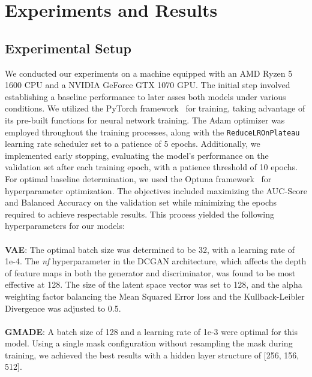 \cleardoubleoddpage%
\chapter{Experiments and Results}
\section{Experimental Setup}
We conducted our experiments on a machine equipped with an AMD Ryzen 5 1600 CPU and a NVIDIA GeForce GTX 1070 GPU. The initial step involved establishing a baseline performance to later asses both models under various conditions. We utilized the PyTorch framework~\cite{paszke2019pytorch} for training, taking advantage of its pre-built functions for neural network training. The Adam optimizer was employed throughout the training processes, along with the \lstinline{ReduceLROnPlateau} learning rate scheduler set to a patience of 5 epochs. Additionally, we implemented early stopping, evaluating the model's performance on the validation set after each training epoch, with a patience threshold of 10 epochs.\\
For optimal baseline determination, we used the Optuna framework~\cite{akiba2019optuna} for hyperparameter optimization. The objectives included maximizing the AUC-Score and Balanced Accuracy on the validation set while minimizing the epochs required to achieve respectable results. This process yielded the following hyperparameters for our models:\\\\
\textbf{VAE}: The optimal batch size was determined to be 32, with a learning rate of 1e-4. The \textit{nf} hyperparameter in the DCGAN architecture, which affects the depth of feature maps in both the generator and discriminator, was found to be most effective at 128. The size of the latent space vector was set to 128, and the alpha weighting factor balancing the Mean Squared Error loss and the Kullback-Leibler Divergence was adjusted to 0.5.\\\\
\textbf{GMADE}: A batch size of 128 and a learning rate of 1e-3 were optimal for this model. Using a single mask configuration without resampling the mask during training, we achieved the best results with a hidden layer structure of [256, 156, 512].
